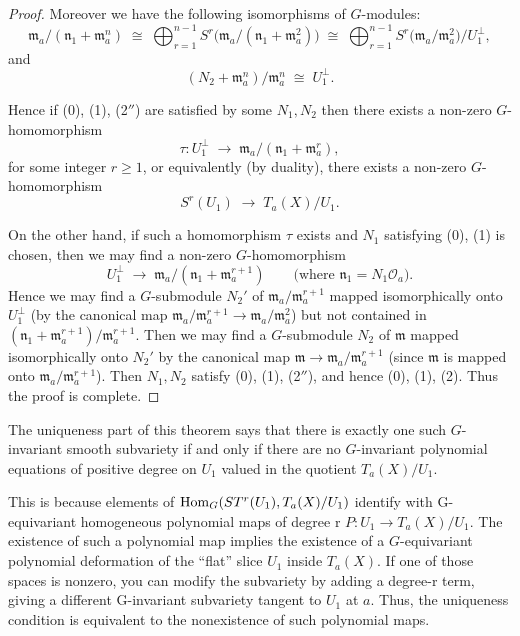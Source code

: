 \documentclass[12pt]{article}
\begin{document}
\begin{proof}
Moreover we have the following isomorphisms of $G$-modules:
\[
   \mathfrak m_a/(\mathfrak n_1 + \mathfrak m_a^n) 
   \;\cong\; \bigoplus_{r=1}^{n-1} S^r\!\big(\mathfrak m_a/(\mathfrak n_1 + \mathfrak m_a^2)\big)
   \;\cong\; \bigoplus_{r=1}^{n-1} S^r\!\big(\mathfrak m_a/\mathfrak m_a^2\big) / U_1^\perp,
\]
and
\[
   (N_2+\mathfrak m_a^n)/\mathfrak m_a^n \;\cong\; U_1^\perp.
\]

Hence if (0), (1), (2$''$) are satisfied by some $N_1, N_2$ then there exists a 
non-zero $G$-homomorphism
\[
   \tau : U_1^\perp \;\longrightarrow\; \mathfrak m_a/(\mathfrak n_1 + \mathfrak m_a^r),
\]
for some integer $r \ge 1$, or equivalently (by duality), there exists a 
non-zero $G$-homomorphism
\[
   S^r(U_1) \;\longrightarrow\; T_a(X)/U_1.
\]

On the other hand, if such a homomorphism $\tau$ exists and $N_1$ satisfying 
(0), (1) is chosen, then we may find a non-zero $G$-homomorphism
\[
   U_1^\perp \;\longrightarrow\; \mathfrak m_a/(\mathfrak n_1 + \mathfrak m_a^{r+1})
   \qquad \text{(where $\mathfrak n_1 = N_1 \mathcal O_a$).}
\]
Hence we may find a $G$-submodule $N_2'$ of $\mathfrak m_a/\mathfrak m_a^{r+1}$ 
mapped isomorphically onto $U_1^\perp$ (by the canonical map 
$\mathfrak m_a/\mathfrak m_a^{r+1} \to \mathfrak m_a/\mathfrak m_a^2$) but not 
contained in $(\mathfrak n_1 + \mathfrak m_a^{r+1})/\mathfrak m_a^{r+1}$.  
Then we may find a $G$-submodule $N_2$ of $\mathfrak m$ mapped isomorphically 
onto $N_2'$ by the canonical map $\mathfrak m \to \mathfrak m_a/\mathfrak m_a^{r+1}$ 
(since $\mathfrak m$ is mapped onto $\mathfrak m_a/\mathfrak m_a^{r+1}$).  
Then $N_1, N_2$ satisfy (0), (1), (2$''$), and hence (0), (1), (2).  
Thus the proof is complete.
\end{proof}

\begin{remark}
    The uniqueness part of this theorem says that there is exactly one such $G$-invariant smooth subvariety if and only if there are no $G$-invariant polynomial equations of positive degree on $U_1$ valued in the quotient $T_a(X)/U_1$.

   This is because elements of \(\operatorname{Hom}_G(ST^r(U_1), T_a(X)/U_1)\) identify with G-equivariant homogeneous polynomial maps of degree r $P : U_1 \longrightarrow T_a(X)/U_1$. The existence of such a polynomial map implies the existence of a $G$-equivariant polynomial deformation of the “flat” slice $U_1$ inside $T_a(X)$.
   If one of those spaces is nonzero, you can modify the subvariety by adding a degree-r term, giving a different G-invariant subvariety tangent to $U_1$ at $a$. Thus, the uniqueness condition is equivalent to the nonexistence of such polynomial maps.
\end{remark}
\end{document}
